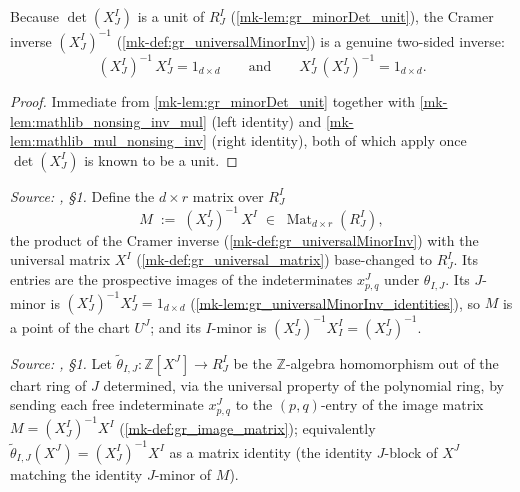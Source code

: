 \begin{lemma}\label{mk-lem:gr_universalMinorInv_identities}
  \leanok

  Because \(\det(X^I_J)\) is a unit of \(R^I_J\) (\ref{mk-lem:gr_minorDet_unit}),
  the Cramer inverse \((X^I_J)^{-1}\) (\ref{mk-def:gr_universalMinorInv}) is a
  genuine two-sided inverse:
  \[
    (X^I_J)^{-1}\, X^I_J = 1_{d\times d}
    \qquad\text{and}\qquad
    X^I_J\, (X^I_J)^{-1} = 1_{d\times d}.
  \]
\end{lemma}
\begin{proof}
  \leanok
  Immediate from \ref{mk-lem:gr_minorDet_unit} together with
  \ref{mk-lem:mathlib_nonsing_inv_mul} (left identity) and
  \ref{mk-lem:mathlib_mul_nonsing_inv} (right identity), both of which apply once
  \(\det(X^I_J)\) is known to be a unit.
\end{proof}

\begin{definition}[The image matrix \(M = (X^I_J)^{-1} X^I\)]\label{mk-def:gr_image_matrix}
  \leanok

  \textit{Source: \cite{nitsure-hilbert-quot}, \S 1.}
  Define the \(d \times r\) matrix over \(R^I_J\)
  \[
    M \;:=\; (X^I_J)^{-1}\, X^I \;\in\; \operatorname{Mat}_{d \times r}(R^I_J),
  \]
  the product of the Cramer inverse (\ref{mk-def:gr_universalMinorInv}) with the
  universal matrix \(X^I\) (\ref{mk-def:gr_universal_matrix}) base-changed to
  \(R^I_J\). Its entries are the prospective images of the indeterminates
  \(x^J_{p,q}\) under \(\theta_{I,J}\). Its \(J\)-minor is \((X^I_J)^{-1} X^I_J =
  1_{d\times d}\) (\ref{mk-lem:gr_universalMinorInv_identities}), so \(M\) is a
  point of the chart \(U^J\); and its \(I\)-minor is \((X^I_J)^{-1} X^I_I =
  (X^I_J)^{-1}\).
\end{definition}

\begin{definition}\label{mk-def:gr_transition_pre}
  \leanok

  \textit{Source: \cite{nitsure-hilbert-quot}, \S 1.}
  Let \(\tilde\theta_{I,J} : \mathbb{Z}[X^J] \to R^I_J\) be the
  \(\mathbb{Z}\)-algebra homomorphism out of the chart ring of \(J\) determined,
  via the universal property of the polynomial ring, by sending each free
  indeterminate \(x^J_{p,q}\) to the \((p,q)\)-entry of the image matrix \(M =
  (X^I_J)^{-1} X^I\) (\ref{mk-def:gr_image_matrix}); equivalently
  \(\tilde\theta_{I,J}(X^J) = (X^I_J)^{-1} X^I\) as a matrix identity (the
  identity \(J\)-block of \(X^J\) matching the identity \(J\)-minor of \(M\)).
\end{definition}

